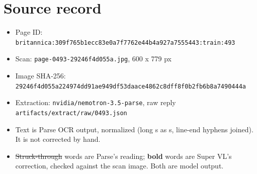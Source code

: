 \documentclass[10pt]{article}
\begin{document}
\section*{Source record}
\begin{itemize}
\item Page ID: \texttt{britannica:309f765b1ecc83e0a7f7762e44b4a927a7555443:train:493}
\item Scan: \texttt{page-0493-29246f4d055a.jpg}, 600 x 779 px
\item Image SHA-256: \texttt{\small 29246f4d055a224974dd91ae949df53daace4862c8dff8f0b2fb6b8a7490444a}
\item Extraction: \texttt{nvidia/nemotron-3.5-parse}, raw reply \texttt{artifacts/extract/raw/0493.json}
\item Text is Parse OCR output, normalized (long s as s, line-end hyphens joined). It is not corrected by hand.
\item \sout{Struck-through} words are Parse's reading; \textbf{bold} words are Super VL's correction, checked against the scan image. Both are model output.
\end{itemize}
\end{document}
